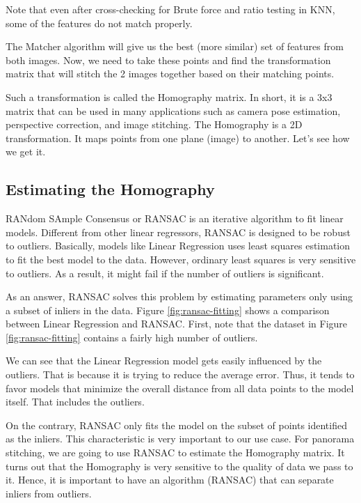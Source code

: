 \documentclass[10pt,twocolumn,letterpaper]{article}
\begin{document}
Note that even after cross-checking for Brute force and ratio testing in KNN, some of the features do not match properly.

The Matcher algorithm will give us the best (more similar) set of features from both images. Now, we need to take these points and find the transformation matrix that will stitch the 2 images together based on their matching points.

Such a transformation is called the Homography matrix. In short, it is a 3x3 matrix that can be used in many applications such as camera pose estimation, perspective correction, and image stitching. The Homography is a 2D transformation. It maps points from one plane (image) to another. Let's see how we get it.

\subsection{Estimating the Homography}

RANdom SAmple Consensus or RANSAC is an iterative algorithm to fit linear models. Different from other linear regressors, RANSAC is designed to be robust to outliers. Basically, models like Linear Regression uses least squares estimation to fit the best model to the data. However, ordinary least squares is very sensitive to outliers. As a result, it might fail if the number of outliers is significant.

As an answer, RANSAC solves this problem by estimating parameters only using a subset of inliers in the data. Figure \ref{fig:ransac-fitting} shows a comparison between Linear Regression and RANSAC. First, note that the dataset in Figure \ref{fig:ransac-fitting} contains a fairly high number of outliers.

We can see that the Linear Regression model gets easily influenced by the outliers. That is because it is trying to reduce the average error. Thus, it tends to favor models that minimize the overall distance from all data points to the model itself. That includes the outliers.

On the contrary, RANSAC only fits the model on the subset of points identified as the inliers.
This characteristic is very important to our use case. For panorama stitching, we are going to use RANSAC to estimate the Homography matrix. It turns out that the Homography is very sensitive to the quality of data we pass to it. Hence, it is important to have an algorithm (RANSAC) that can separate inliers from outliers.
\end{document}
